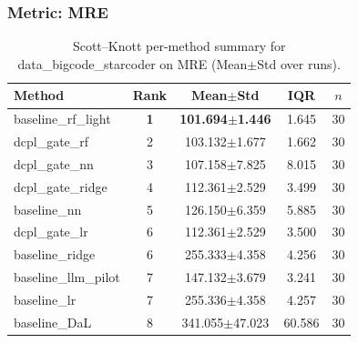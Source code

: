 \subsubsection*{Metric: MRE}
\begin{table}[H]
\centering
\scriptsize
\setlength{\tabcolsep}{4pt}
\renewcommand{\arraystretch}{1.1}
\caption{Scott--Knott per-method summary for data\_bigcode\_starcoder on MRE (Mean$\pm$Std over runs).}
\label{tab:sk_data_bigcode_starcoder_MRE}
\begin{tabular}{l|c|c|c|c}
\hline
\textbf{Method} & \textbf{Rank} & \textbf{Mean$\pm$Std} & \textbf{IQR} & \textbf{$n$} \\
\hline
\rowcolor{red!15} baseline\_rf\_light & \textbf{1} & \textbf{101.694$\pm$1.446} & 1.645 & 30 \\
dcpl\_gate\_rf & 2 & 103.132$\pm$1.677 & 1.662 & 30 \\
dcpl\_gate\_nn & 3 & 107.158$\pm$7.825 & 8.015 & 30 \\
dcpl\_gate\_ridge & 4 & 112.361$\pm$2.529 & 3.499 & 30 \\
baseline\_nn & 5 & 126.150$\pm$6.359 & 5.885 & 30 \\
dcpl\_gate\_lr & 6 & 112.361$\pm$2.529 & 3.500 & 30 \\
baseline\_ridge & 6 & 255.333$\pm$4.358 & 4.256 & 30 \\
baseline\_llm\_pilot & 7 & 147.132$\pm$3.679 & 3.241 & 30 \\
baseline\_lr & 7 & 255.336$\pm$4.358 & 4.257 & 30 \\
baseline\_DaL & 8 & 341.055$\pm$47.023 & 60.586 & 30 \\
\hline
\end{tabular}
\end{table}
